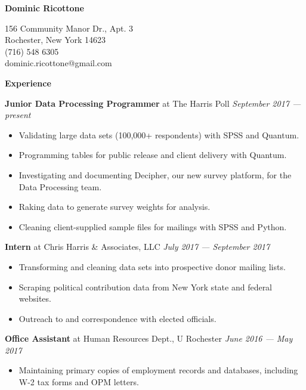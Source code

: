 \documentclass[12pt]{article}
\newenvironment{details}{
\begin{itemize}[label={}]
  \small \setlength{\itemsep}{0pt}
}{\end{itemize}}
\begin{document}
\centering \Huge
\textbf{Dominic Ricottone}

\footnotesize
\begin{multicols}{2}
156 Community Manor Dr., Apt. 3 \\
Rochester, New York 14623 \\
(716) 548 6305 \\
dominic.ricottone@gmail.com
\end{multicols}

\large
\textbf{Experience} \hrulefill

\vspace{.1in}
\normalsize
\textbf{Junior Data Processing Programmer} at The Harris Poll \hfill \textit{September 2017 --- present}
\begin{details}
  \item Validating large data sets (100,000+ respondents) with SPSS and Quantum.
  \item Programming tables for public release and client delivery with Quantum.
  \item Investigating and documenting Decipher, our new survey platform, for the Data Processing team.
  \item Raking data to generate survey weights for analysis.
  \item Cleaning client-supplied sample files for mailings with SPSS and Python.
\end{details}

\vspace{.1in}
\normalsize
\textbf{Intern} at Chris Harris \& Associates, LLC \hfill \textit{July 2017 --- September 2017}
\begin{details}
	\item Transforming and cleaning data sets into prospective donor mailing lists.
	\item Scraping political contribution data from New York state and federal websites.
	\item Outreach to and correspondence with elected officials.
\end{details}

\vspace{.1in}
\normalsize
\textbf{Office Assistant} at Human Resources Dept., U Rochester  \hfill \textit{June 2016 --- May 2017}
\begin{details}
  \item Maintaining primary copies of employment records and databases, including W-2 tax forms and OPM letters.
\end{details}
\end{document}
